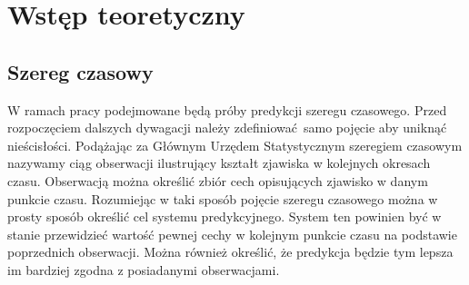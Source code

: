\documentclass[10pt,a4paper]{article}
\begin{document}
\section{Wstęp teoretyczny}
\subsection{Szereg czasowy}
W ramach pracy podejmowane będą próby predykcji szeregu czasowego. Przed rozpoczęciem dalszych dywagacji należy zdefiniować samo pojęcie aby uniknąć nieścisłości. Podążając za Głównym Urzędem Statystycznym szeregiem czasowym nazywamy ciąg obserwacji ilustrujący kształt zjawiska w kolejnych okresach czasu. Obserwacją można określić zbiór cech opisujących zjawisko w danym punkcie czasu. Rozumiejąc w taki sposób pojęcie szeregu czasowego można w prosty sposób określić cel systemu predykcyjnego. System ten powinien być w stanie przewidzieć wartość pewnej cechy w kolejnym punkcie czasu na podstawie poprzednich obserwacji. Można również określić, że predykcja będzie tym lepsza im bardziej zgodna z posiadanymi obserwacjami. 
\end{document}

